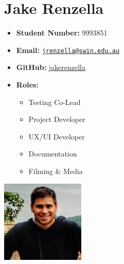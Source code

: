 \documentclass[a4paper]{article}
\providecommand{\tightlist}{%
  \setlength{\itemsep}{0pt}\setlength{\parskip}{0pt}}
\begin{document}
\begin{minipage}{0.7\textwidth}
\section{Jake Renzella}\label{jake-renzella}
\begin{itemize}[label={}]
\tightlist
\item
  \textbf{Student Number:} 9993851
\item
  \textbf{Email:}
  \href{mailto:jrenzella@swin.edu.au}{\nolinkurl{jrenzella@swin.edu.au}}
\item
  \textbf{GitHub:}
  \href{http://www.github.com/jakerenzella}{jakerenzella}
\item
  \textbf{Roles:}
  \begin{itemize}
    \item Testing Co-Lead
    \item Project Developer
    \item UX/UI Developer
    \item Documentation
    \item Filming \& Media
  \end{itemize}
\end{itemize}
\end{minipage}%
\begin{minipage}{0.3\textwidth}
\includegraphics{./imgs/jake.png}
\end{minipage}

\vspace{3em}
\end{document}
